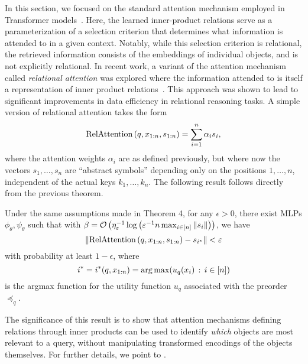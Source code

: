 In this section, we focused on the standard attention mechanism employed in Transformer models~\citep{vaswani2017attention}. Here, the learned inner-product relations serve as a parameterization of a selection criterion that determines what information is attended to in a given context. Notably, while this selection criterion is relational, the retrieved information consists of the embeddings of individual objects, and is not explicitly relational. In recent work, a variant of the attention mechanism called \textit{relational attention} was explored where the information attended to is itself a representation of inner product relations~\citep{altabaaAbstractorsRelationalCrossattention2024, altabaa2024disentanglingintegratingrelationalsensory}. This approach was shown to lead to significant improvements in data efficiency in relational reasoning tasks. 
A simple version of relational attention takes the form
\begin{equation}\label{eq:def_relattention}
\mathrm{RelAttention}\paren{q, x_{1:n}, s_{1:n}} = \sum_{i=1}^n \alpha_i s_i,
\end{equation}
where the attention weights $\alpha_i$ are as defined previously, but where now
the vectors $s_1,\ldots, s_n$ are ``abstract symbols'' depending only on the positions $1,\ldots, n$,
independent of the actual keys $k_1,\ldots, k_n$. The following result follows 
directly from the previous theorem.

\begin{corollary}
    Under the same assumptions made in Theorem 4, 
    for any $\epsilon > 0$, there exist MLPs $\phi_\theta, \psi_\theta$ such that with $\beta = {\mathcal{O}}\left(\eta_\varepsilon^{-1} \log\left(\varepsilon^{-1} n \max_{i \in [n]} \left\lVert s_i\right\rVert\right)\right)$, we have
     \begin{equation*}
         \left\lVert\mathrm{RelAttention}\left(q, x_{1:n}, s_{1:n}\right) - s_{i^*}\right\rVert < \varepsilon
     \end{equation*}
     with probability at least $1 - \epsilon$, where 
     $$i^* = i^*(q,x_{1:n}) = \operatorname*{arg\,max}(u_q(x_i)\,:\, i\in[n])$$ 
     is the argmax function for the utility function $u_q$ associated with 
     the preorder $\preceq_q$.
\end{corollary}

 The significance of this result is to show that attention mechanisms defining relations through inner products can be used to identify \textit{which} objects are most relevant to a query, without manipulating transformed encodings of the objects themselves. For further details, we point to \citet{altabaaAbstractorsRelationalCrossattention2024, altabaa2024disentanglingintegratingrelationalsensory}.
